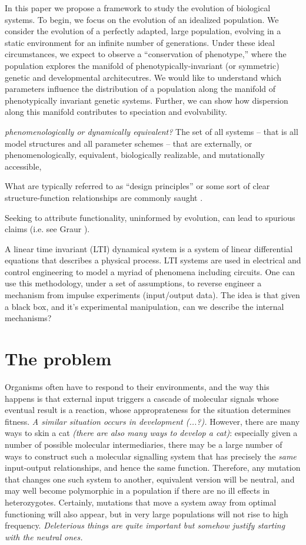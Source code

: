 \documentclass[11 pt]{article}
\newcommand{\plr}[1]{{\color{blue}\it #1}}
\newcommand{\jss}[1]{{\color{olive}\it #1}}
\begin{document}
In this paper we propose a framework to study the evolution of biological systems. To begin, we focus on the evolution of an idealized population. We consider the evolution of a perfectly adapted, large population, evolving in a static environment for an infinite number of generations. Under these ideal circumstances, we expect to observe a ``conservation of phenotype,'' where the population explores the manifold of phenotypically-invariant (or symmetric) genetic and developmental architecutres. We would like to understand which parameters influence the distribution of a population along the manifold of phenotypically invariant genetic systems. Further, we can show how dispersion along this manifold contributes to speciation and evolvability. 

\plr{phenomenologically or dynamically equivalent?}
The set of all systems -- that is all model structures and all parameter schemes -- that
are externally, or phenomenologically, equivalent, biologically realizable, and mutationally accessible, 

What are typically referred to as ``design principles'' or some sort of clear structure-function relationships are commonly saught \citep{milo2002network, alon2007network, ma2009defining}. 

Seeking to attribute functionality, uninformed by evolution, can lead to spurious claims
(i.e. see Graur \citep{lynch2007evolution, lynch2007frailty, graur2013immortality}).


A linear time invariant (LTI) dynamical system is a system of linear
differential equations that describes a physical process. 
LTI systems are used in electrical and control engineering to model a myriad of phenomena including
circuits. 
One can use this methodology, under a set of assumptions, to reverse engineer a
mechanism from impulse experiments (input/output data). The idea is that given
a black box, and it's experimental manipulation, can we describe the internal
mechanisms? 

\section{The problem}

Organisms often have to respond to their environments,
and the way this happens is that external input triggers a cascade of molecular signals
whose eventual result is a reaction,
whose approprateness for the situation determines fitness.
\plr{A similar situation occurs in development (...?).}
However, there are many ways to skin a cat \jss{(there are also many ways to develop a cat)}:
especially given a number of possible molecular intermediaries,
there may be a large number of ways to construct such a molecular signalling system
that has precisely the \emph{same} input-output relationships,
and hence the same function.
Therefore, any mutation that changes one such system to another, equivalent version
will be neutral,
and may well become polymorphic in a population if there are no ill effects in heterozygotes.
Certainly, mutations that move a system away from optimal functioning will also appear,
but in very large populations will not rise to high frequency.
\plr{Deleterious things are quite important but somehow justify starting with the neutral ones.}
\end{document}
